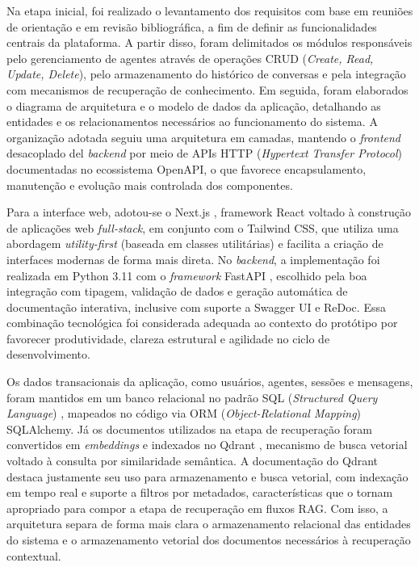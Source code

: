 \documentclass[12pt, openright, oneside, a4paper, brazil]{ads-unipac-abntex2}
\begin{document}
Na etapa inicial, foi realizado o levantamento dos requisitos com base em reuniões de orientação e em revisão bibliográfica, a fim de definir as funcionalidades centrais da plataforma. A partir disso, foram delimitados os módulos responsáveis pelo gerenciamento de agentes através de operações CRUD (\textit{Create, Read, Update, Delete}), pelo armazenamento do histórico de conversas e pela integração com mecanismos de recuperação de conhecimento. Em seguida, foram elaborados o diagrama de arquitetura e o modelo de dados da aplicação, detalhando as entidades e os relacionamentos necessários ao funcionamento do sistema. A organização adotada seguiu uma arquitetura em camadas, mantendo o \textit{frontend} desacoplado del \textit{backend} por meio de APIs HTTP (\textit{Hypertext Transfer Protocol}) documentadas no ecossistema OpenAPI, o que favorece encapsulamento, manutenção e evolução mais controlada dos componentes. 

Para a interface web, adotou-se o Next.js \cite{verma2024nextjs}, framework React voltado à construção de aplicações web \textit{full-stack}, em conjunto com o Tailwind CSS, que utiliza uma abordagem \textit{utility-first} (baseada em classes utilitárias) e facilita a criação de interfaces modernas de forma mais direta. No \textit{backend}, a implementação foi realizada em Python 3.11 com o \textit{framework} FastAPI \cite{tiangolo2018fastapi}, escolhido pela boa integração com tipagem, validação de dados e geração automática de documentação interativa, inclusive com suporte a Swagger UI e ReDoc. Essa combinação tecnológica foi considerada adequada ao contexto do protótipo por favorecer produtividade, clareza estrutural e agilidade no ciclo de desenvolvimento. 

Os dados transacionais da aplicação, como usuários, agentes, sessões e mensagens, foram mantidos em um banco relacional no padrão SQL (\textit{Structured Query Language}) \cite{silberschatz2020db}, mapeados no código via ORM (\textit{Object-Relational Mapping}) SQLAlchemy. Já os documentos utilizados na etapa de recuperação foram convertidos em \textit{embeddings} e indexados no Qdrant \cite{qdrant2020}, mecanismo de busca vetorial voltado à consulta por similaridade semântica. A documentação do Qdrant destaca justamente seu uso para armazenamento e busca vetorial, com indexação em tempo real e suporte a filtros por metadados, características que o tornam apropriado para compor a etapa de recuperação em fluxos RAG. Com isso, a arquitetura separa de forma mais clara o armazenamento relacional das entidades do sistema e o armazenamento vetorial dos documentos necessários à recuperação contextual. 
\end{document}
